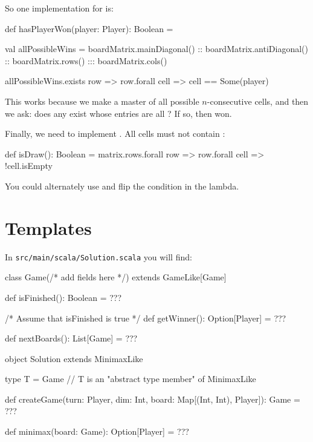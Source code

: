 \documentclass{book}
\begin{document}
So one implementation for  is:

\begin{scalacode}
def hasPlayerWon(player: Player): Boolean = {
  val allPossibleWins =
    boardMatrix.mainDiagonal() ::
    boardMatrix.antiDiagonal() ::
    boardMatrix.rows() :::
    boardMatrix.cols()

  allPossibleWins.exists { row => row.forall { cell => cell == Some(player) } }
}
\end{scalacode}

This works because we make a master  of all possible $n$-consecutive cells, and then we ask: does any \scalainline{[List[Option[Player]]} exist whose entries are all ?  If so, then  won.

Finally, we need to implement .  All cells must not contain :

\begin{scalacode}
  def isDraw(): Boolean = {
    matrix.rows.forall { row =>
      row.forall { cell => !cell.isEmpty }
    }
  }
\end{scalacode}

You could alternately use  and flip the condition in the lambda.

\section{Templates}

In \texttt{src/main/scala/Solution.scala} you will find:

\begin{scalacode}
class Game(/* add fields here */) extends GameLike[Game] {

  def isFinished(): Boolean = ???

  /* Assume that isFinished is true */
  def getWinner(): Option[Player] = ???

  def nextBoards(): List[Game] = ???
}

object Solution extends MinimaxLike {

  type T = Game // T is an "abstract type member" of MinimaxLike

  def createGame(turn: Player, dim: Int, board: Map[(Int, Int), Player]): Game = ???

  def minimax(board: Game): Option[Player] = ???

}
\end{scalacode}
\end{document}
